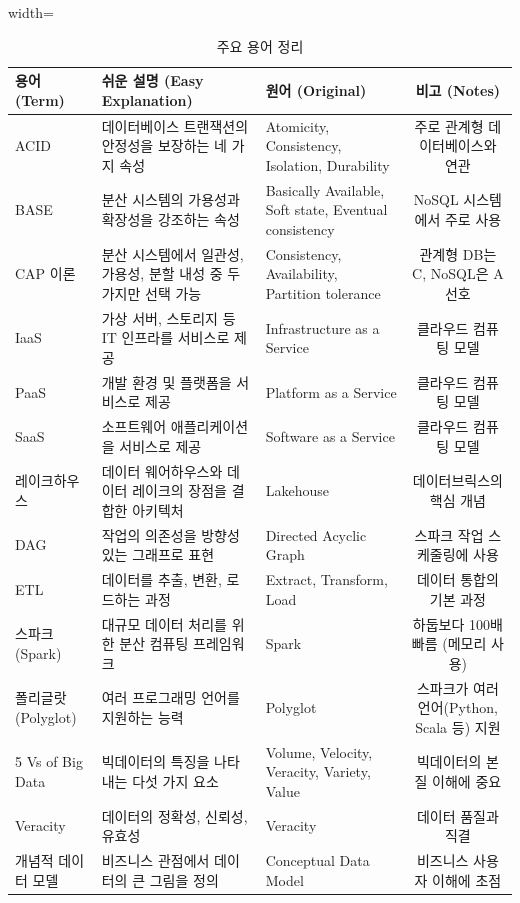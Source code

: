 \documentclass[11pt,a4paper]{article}
\begin{document}
\begin{table}[h!]
\centering
\caption{주요 용어 정리}
\label{tab:glossary}
\begin{adjustbox}{width=\textwidth}
\begin{tabular}{lllc}
\toprule
\textbf{용어 (Term)} & \textbf{쉬운 설명 (Easy Explanation)} & \textbf{원어 (Original)} & \textbf{비고 (Notes)} \\
\midrule
ACID & 데이터베이스 트랜잭션의 안정성을 보장하는 네 가지 속성 & Atomicity, Consistency, Isolation, Durability & 주로 관계형 데이터베이스와 연관 \\
BASE & 분산 시스템의 가용성과 확장성을 강조하는 속성 & Basically Available, Soft state, Eventual consistency & NoSQL 시스템에서 주로 사용 \\
CAP 이론 & 분산 시스템에서 일관성, 가용성, 분할 내성 중 두 가지만 선택 가능 & Consistency, Availability, Partition tolerance & 관계형 DB는 C, NoSQL은 A 선호 \\
IaaS & 가상 서버, 스토리지 등 IT 인프라를 서비스로 제공 & Infrastructure as a Service & 클라우드 컴퓨팅 모델 \\
PaaS & 개발 환경 및 플랫폼을 서비스로 제공 & Platform as a Service & 클라우드 컴퓨팅 모델 \\
SaaS & 소프트웨어 애플리케이션을 서비스로 제공 & Software as a Service & 클라우드 컴퓨팅 모델 \\
레이크하우스 & 데이터 웨어하우스와 데이터 레이크의 장점을 결합한 아키텍처 & Lakehouse & 데이터브릭스의 핵심 개념 \\
DAG & 작업의 의존성을 방향성 있는 그래프로 표현 & Directed Acyclic Graph & 스파크 작업 스케줄링에 사용 \\
ETL & 데이터를 추출, 변환, 로드하는 과정 & Extract, Transform, Load & 데이터 통합의 기본 과정 \\
스파크 (Spark) & 대규모 데이터 처리를 위한 분산 컴퓨팅 프레임워크 & Spark & 하둡보다 100배 빠름 (메모리 사용) \\
폴리글랏 (Polyglot) & 여러 프로그래밍 언어를 지원하는 능력 & Polyglot & 스파크가 여러 언어(Python, Scala 등) 지원 \\
5 Vs of Big Data & 빅데이터의 특징을 나타내는 다섯 가지 요소 & Volume, Velocity, Veracity, Variety, Value & 빅데이터의 본질 이해에 중요 \\
Veracity & 데이터의 정확성, 신뢰성, 유효성 & Veracity & 데이터 품질과 직결 \\
개념적 데이터 모델 & 비즈니스 관점에서 데이터의 큰 그림을 정의 & Conceptual Data Model & 비즈니스 사용자 이해에 초점 \\

\end{tabular}
\end{adjustbox}
\end{table}
\end{document}

